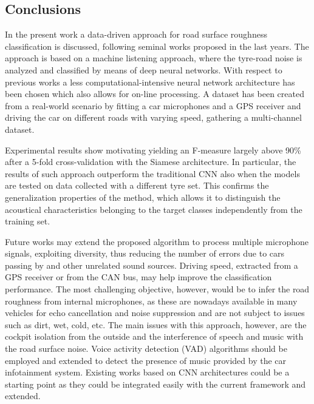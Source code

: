 \subsection{Conclusions} 

In the present work a data-driven approach for road surface roughness classification is discussed, following seminal works proposed in the last years. The approach is based on a machine listening approach, where the tyre-road noise is analyzed and classified by means of deep neural networks. With respect to previous works a less computational-intensive neural network architecture has been chosen which also allows for on-line processing. A dataset has been created from a real-world scenario by fitting a car microphones and a GPS receiver and driving the car on different roads with varying speed, gathering a multi-channel dataset. 


Experimental results show motivating yielding an F-measure largely above 90\% after a 5-fold cross-validation with the Siamese architecture. In particular, the results of such approach outperform the traditional CNN also when the models are tested on data collected with a different tyre set. This confirms the generalization properties of the method, which allows it to distinguish the acoustical characteristics belonging to the target classes independently from the training set.


Future works may extend the proposed algorithm to process multiple microphone signals, exploiting diversity, thus reducing the number of errors due to cars passing by and other unrelated sound sources. Driving speed, extracted from a GPS receiver or from the CAN bus, may help improve the classification performance. The most challenging objective, however, would be to infer the road roughness from internal microphones, as these are nowadays available in many vehicles for echo cancellation and noise suppression and are not subject to issues such as dirt, wet, cold, etc. The main issues with this approach, however, are the cockpit isolation from the outside and the interference of speech and music with the road surface noise. Voice activity detection (VAD) \cite{Ephraim:1984,ghosh2011robust} algorithms should be employed and extended to detect the presence of music provided by the car infotainment system. Existing works based on CNN architectures \cite{vecchiotti2018convolutional,ijcnn2016-vad} could be a starting point as they could be integrated easily with the current framework and extended.

